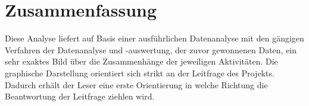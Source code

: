 \section{Zusammenfassung}
\label{ch:Analyse:sec:zusammenfassung}


Diese Analyse liefert auf Basis einer ausführlichen Datenanalyse mit den gängigen Verfahren der Datenanalyse und -auswertung, der zuvor gewonnenen Daten, ein sehr exaktes Bild über die Zusammenhänge der jeweiligen Aktivitäten.
Die graphische Darstellung orientiert sich strikt an der Leitfrage des Projekts. 
Dadurch erhält der Leser eine erste Orientierung in welche Richtung die Beantwortung der Leitfrage ziehlen wird.


